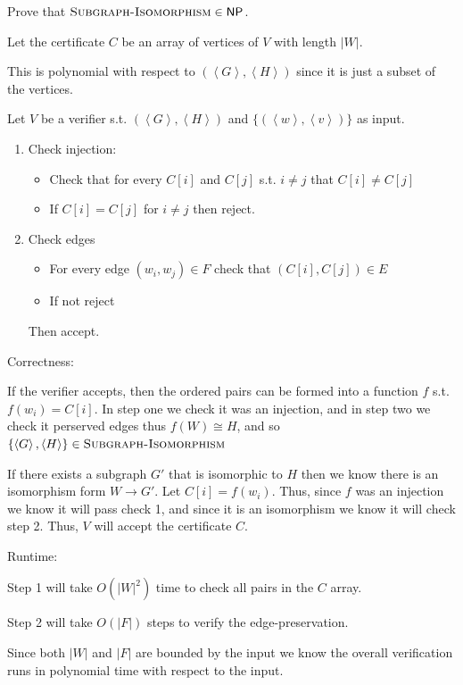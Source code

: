 \documentclass[12pt, letterpaper]{article}
\newcommand{\NP}{\mathsf{NP}}
\newcommand{\ang}[1]{\left\langle #1 \right\rangle}
\begin{document}
\begin{subproblem}{}
    Prove that $\subgraphiso \in \NP$.
\end{subproblem}
\begin{problemproof}
    Let the certificate $C$ be an array of vertices of $V$ with length $|W|$.

    This is polynomial with respect to $(\ang{G},\ang{H})$ since it is just a subset of the vertices.

    Let $V$ be a verifier s.t. $(\ang{G},\ang{H})$ and $\{(\ang{w},\ang{v})\}$ as input.

    \begin{enumerate}
        \item Check injection:
        \begin{itemize}
            \item Check that for every $C[i]$ and $C[j]$ s.t. $i \neq j$ that $C[i] \neq C[j]$
            \item If $C[i]=C[j]$ for $i \neq j$ then reject.
        \end{itemize}
        \item Check edges
        \begin{itemize}
            \item For every edge $(w_i,w_j) \in F$ check that $(C[i],C[j]) \in E$
            \item If not reject
        \end{itemize}
        Then accept.
    \end{enumerate}

    Correctness:

    If the verifier accepts, then the ordered pairs can be formed into a function $f$ s.t. $f(w_i)=C[i]$. In step one we check it was an injection, and in step two we check it perserved edges thus $f(W) \cong H$, and so $\{\ang{G},\ang{H}\} \in \subgraphiso$

    If there exists a subgraph $G'$ that is isomorphic to $H$ then we know there is an isomorphism form $W \to G'$. Let $C[i]=f(w_i)$. Thus, since $f$ was an injection we know it will pass check 1, and since it is an isomorphism we know it will check step 2. Thus, $V$ will accept the certificate $C$.

    Runtime:

    Step 1 will take $O(|W|^2)$ time to check all pairs in the $C$ array.

    Step 2 will take $O(|F|)$ steps to verify the edge-preservation.

    Since both $|W|$ and $|F|$ are bounded by the input we know the overall verification runs in polynomial time with respect to the input.
\end{problemproof}
\end{document}
